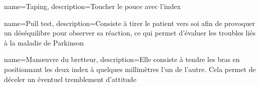 {
    name=Taping,
    description={Toucher le pouce avec l'index}
}

{
    name=Pull test,
    description={Consiste à tirer le patient vers soi afin de provoquer un déséquilibre pour observer sa réaction, ce qui permet d'évaluer les troubles liés à la maladie de Parkinson}
}

{
    name=Man\oe{}uvre du bretteur,
    description={Elle consiste à tendre les bras en positionnant les deux index à quelques millimètres l’un de l’autre. Cela permet de déceler un éventuel tremblement d’attitude}
}




